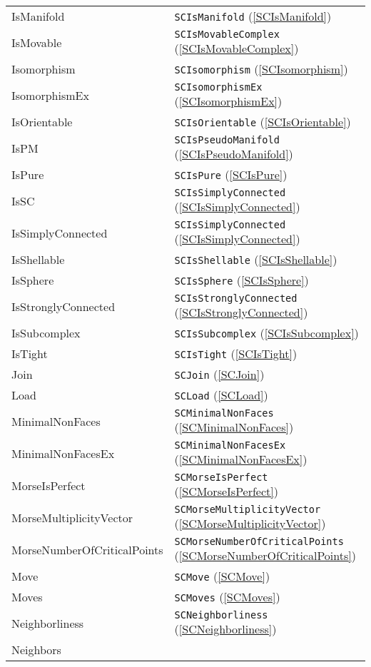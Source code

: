 \documentclass[a4paper,11pt]{report}
\begin{document}
{{ \begin{center}
\begin{tabular}{ll}IsManifold&
\texttt{SCIsManifold} (\ref{SCIsManifold})\\
IsMovable&
\texttt{SCIsMovableComplex} (\ref{SCIsMovableComplex})\\
Isomorphism&
\texttt{SCIsomorphism} (\ref{SCIsomorphism})\\
IsomorphismEx&
\texttt{SCIsomorphismEx} (\ref{SCIsomorphismEx})\\
IsOrientable&
\texttt{SCIsOrientable} (\ref{SCIsOrientable})\\
IsPM&
\texttt{SCIsPseudoManifold} (\ref{SCIsPseudoManifold})\\
IsPure&
\texttt{SCIsPure} (\ref{SCIsPure})\\
IsSC&
\texttt{SCIsSimplyConnected} (\ref{SCIsSimplyConnected})\\
IsSimplyConnected&
\texttt{SCIsSimplyConnected} (\ref{SCIsSimplyConnected})\\
IsShellable&
\texttt{SCIsShellable} (\ref{SCIsShellable})\\
IsSphere&
\texttt{SCIsSphere} (\ref{SCIsSphere})\\
IsStronglyConnected&
\texttt{SCIsStronglyConnected} (\ref{SCIsStronglyConnected})\\
IsSubcomplex&
\texttt{SCIsSubcomplex} (\ref{SCIsSubcomplex})\\
IsTight&
\texttt{SCIsTight} (\ref{SCIsTight})\\
Join&
\texttt{SCJoin} (\ref{SCJoin})\\
Load&
\texttt{SCLoad} (\ref{SCLoad})\\
MinimalNonFaces&
\texttt{SCMinimalNonFaces} (\ref{SCMinimalNonFaces})\\
MinimalNonFacesEx&
\texttt{SCMinimalNonFacesEx} (\ref{SCMinimalNonFacesEx})\\
MorseIsPerfect&
\texttt{SCMorseIsPerfect} (\ref{SCMorseIsPerfect})\\
MorseMultiplicityVector&
\texttt{SCMorseMultiplicityVector} (\ref{SCMorseMultiplicityVector})\\
MorseNumberOfCriticalPoints&
\texttt{SCMorseNumberOfCriticalPoints} (\ref{SCMorseNumberOfCriticalPoints})\\
Move&
\texttt{SCMove} (\ref{SCMove})\\
Moves&
\texttt{SCMoves} (\ref{SCMoves})\\
Neighborliness&
\texttt{SCNeighborliness} (\ref{SCNeighborliness})\\
Neighbors&

\end{tabular}
\end{center}}}
\end{document}

